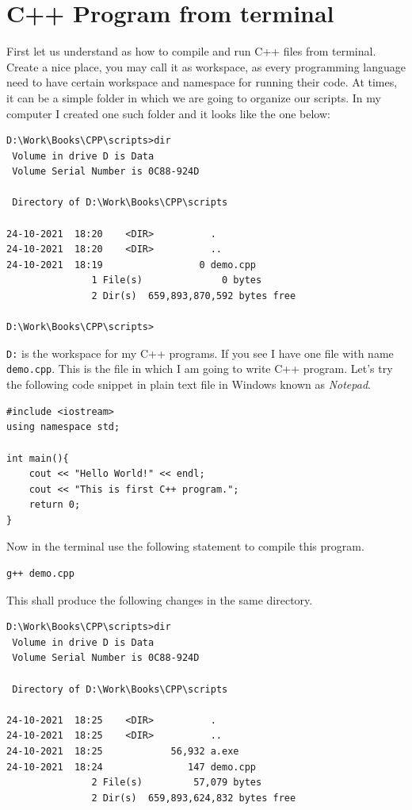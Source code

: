 \documentclass{book}
\begin{document}
\section{C++ Program from terminal}

 First let us understand as how to compile and run C++ files from terminal. Create a nice place, you may call it as workspace, as every programming language need to have certain workspace and namespace for running their code. At times, it can be a simple folder in which we are going to organize our scripts. In my computer I created one such folder and it looks like the one below: 

\begin{verbatim}
D:\Work\Books\CPP\scripts>dir
 Volume in drive D is Data
 Volume Serial Number is 0C88-924D

 Directory of D:\Work\Books\CPP\scripts

24-10-2021  18:20    <DIR>          .
24-10-2021  18:20    <DIR>          ..
24-10-2021  18:19                 0 demo.cpp
               1 File(s)              0 bytes
               2 Dir(s)  659,893,870,592 bytes free

D:\Work\Books\CPP\scripts>
\end{verbatim}

\texttt{D:\Work\Books\CPP\scripts} is the workspace for my C++ programs. If you see I have one file with name \texttt{demo.cpp}. This is the file in which I am going to write C++ program. Let's try the following code snippet in plain text file in Windows known as \emph{Notepad}. 

\begin{verbatim}
#include <iostream>
using namespace std;

int main(){
	cout << "Hello World!" << endl;
	cout << "This is first C++ program.";
	return 0;
}
\end{verbatim}

Now in the terminal use the following statement to compile this program. 

\begin{verbatim}
g++ demo.cpp
\end{verbatim}

This shall produce the following changes in the same directory. 

\begin{verbatim}
D:\Work\Books\CPP\scripts>dir
 Volume in drive D is Data
 Volume Serial Number is 0C88-924D

 Directory of D:\Work\Books\CPP\scripts

24-10-2021  18:25    <DIR>          .
24-10-2021  18:25    <DIR>          ..
24-10-2021  18:25            56,932 a.exe
24-10-2021  18:24               147 demo.cpp
               2 File(s)         57,079 bytes
               2 Dir(s)  659,893,624,832 bytes free
\end{verbatim}
\end{document}
